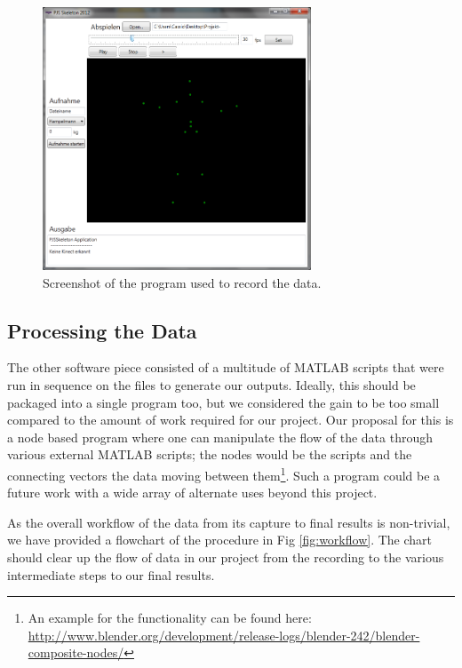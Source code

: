 \documentclass[a4paper]{article}
\begin{document}
\begin{figure}
	\centering
	\includegraphics[width=8cm]{programm.jpg}
	\caption{Screenshot of the program used to record the data.}
	\label{fig:programm}
\end{figure}

\subsection{Processing the Data}

The other software piece consisted of a multitude of MATLAB\cite{matlabprograms} scripts that were run in sequence on the files to generate our outputs.
Ideally, this should be packaged into a single program too, but we considered the gain to be too small compared to the amount of work required for our project.
Our proposal for this is a node based program where one can manipulate the flow of the data through various external MATLAB scripts; the nodes would be the scripts and the connecting vectors the data moving between them\footnote{An example for the functionality can be found here: \url{http://www.blender.org/development/release-logs/blender-242/blender-composite-nodes/}}.
Such a program could be a future work with a wide array of alternate uses beyond this project.

As the overall workflow of the data from its capture to final results is non-trivial, we have provided a flowchart of the procedure in Fig \ref{fig:workflow}.
The chart should clear up the flow of data in our project from the recording to the various intermediate steps to our final results.
\end{document}

